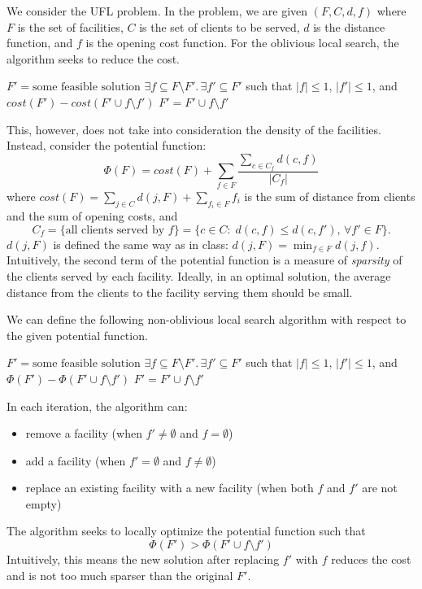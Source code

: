\documentclass[11pt]{article}
\begin{document}
\begin{enumerate}[leftmargin=16pt]
\begin{enumerate}
        We consider the UFL problem. In the problem, we are given $(F,C,d,f)$ where $F$ is the set of facilities, $C$ is the set of clients to be served, $d$ is the distance function, and $f$ is the opening cost function. For the oblivious local search, the algorithm seeks to reduce the cost.
        \begin{codebox}
            \li $F' = \text{some feasible solution}$ 
            \li \While $\exists f \subseteq F \setminus F'.\, \exists f' \subseteq F'$ such that $|f| \leq 1,\, |f'| \leq 1$, and $\mathit{cost}(F') - \mathit{cost}(F' \cup f \setminus f')$ \Do
                \li $F' = F' \cup f \setminus f'$
        \end{codebox}
        This, however, does not take into consideration the density of the facilities. Instead, consider the potential function:
        $$
        \Phi(F) = \mathit{cost}(F) + \sum_{f \in F} \frac{\sum_{c \in C_f} d(c,f)}{|C_f|}
        $$
        where $\mathit{cost}(F) = \sum_{j \in C} d(j,F) + \sum_{f_i \in F} f_i$ is the sum of distance from clients and the sum of opening costs, and
        $$
        C_f = \{ \text{all clients served by $f$} \} = \{c \in C:\; d(c,f) \leq d(c,f'),\, \forall f' \in F\}.
        $$
        $d(j,F)$ is defined the same way as in class: $d(j,F) = \min_{f \in F} d(j,f)$. Intuitively, the second term of the potential function is a measure of \textit{sparsity} of the clients served by each facility. Ideally, in an optimal solution, the average distance from the clients to the facility serving them should be small.

        We can define the following non-oblivious local search algorithm with respect to the given potential function.
        \begin{codebox}
            \li $F' = \text{some feasible solution}$ 
            \li \While $\exists f \subseteq F \setminus F'.\, \exists f' \subseteq F'$ such that $|f| \leq 1,\, |f'| \leq 1$, and $\Phi(F') - \Phi(F' \cup f \setminus f')$ \Do
                \li $F' = F' \cup f \setminus f'$
        \end{codebox}
        In each iteration, the algorithm can:
        \begin{itemize}
            \item remove a facility (when $f' \neq \emptyset$ and $f = \emptyset$)
            \item add a facility (when $f' = \emptyset$ and $f \neq \emptyset$)
            \item replace an existing facility with a new facility (when both $f$ and $f'$ are not empty)
        \end{itemize}
        The algorithm seeks to locally optimize the potential function such that
        $$
        \Phi(F') > \Phi(F' \cup f \setminus f')
        $$
        Intuitively, this means the new solution after replacing $f'$ with $f$ reduces the cost and is not too much sparser than the original $F'$.


\end{enumerate}
\end{enumerate}
\end{document}
